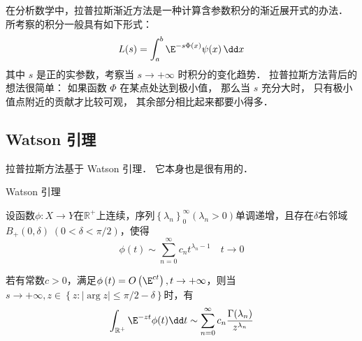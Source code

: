 

在分析数学中，拉普拉斯渐近方法是一种计算含参数积分的渐近展开式的办法． 所考察的积分一般具有如下形式：
\begin{equation}\label{LapAsm_eq1}
L(s)=\int_a^b\E^{-s\Phi(x)}\psi(x)\,\dd x
\end{equation}
其中 $s$ 是正的实参数，考察当 $s\to+\infty$ 时积分的变化趋势． 拉普拉斯方法背后的想法很简单： 如果函数 $\Phi$ 在某点处达到极小值， 那么当 $s$ 充分大时， 只有极小值点附近的贡献才比较可观， 其余部分相比起来都要小得多．

\subsection{Watson 引理}
拉普拉斯方法基于 Watson 引理． 它本身也是很有用的．

\begin{lemma}{Watson 引理}

设函数$\phi:X\to Y$在$\mathbb{R}^+$上连续，序列$\left\{\lambda_n\right\}_0^\infty\left(\lambda_n>0\right)$单调递增，且存在$\delta$右邻域$B_{+}(0,\delta)\;(0<\delta<\pi/2)$，使得
\begin{equation}\label{LapAsm_eq2}
  \phi\left(t\right)\sim\sum_{n=0}^{\infty}{c_nt^{\lambda_n-1}}\quad t\to0
\end{equation}

若有常数$c>0$，满足$\phi\left(t\right)=O\left(\E^{ct}\right),t\to+\infty$，则当$s\to+\infty,z\in{\left\{z:\left|\arg{z}\right|\le\pi/2-\delta\right\}}$时，有
\begin{equation}\label{LapAsm_eq3}
\int_{\mathbb{R}^+}\E^{-zt}\phi(t)\dd t\sim\sum_{n=0}^{\infty}{c_n}\frac{\Gamma(\lambda_n)}{z^{\lambda_n}}  
\end{equation}
\end{lemma}


